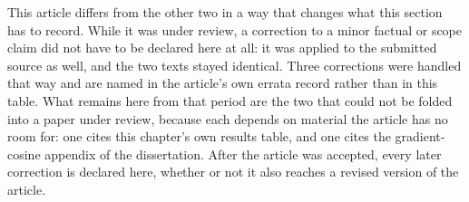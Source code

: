 This article differs from the other two in a way that changes what this section has to record.
While it was under review, a correction to a minor factual or scope claim did not have to be
declared here at all: it was applied to the submitted source as well, and the two texts stayed
identical. Three corrections were handled that way and are named in the
article's own errata record rather than in this table. %
What remains here from that period are the two that could
not be folded into a paper under review, because each depends on material the article has no
room for: one cites this chapter's own results table, and one cites the gradient-cosine appendix of the
dissertation. After the article was accepted, every later correction is declared here, whether
or not it also reaches a revised version of the article.
